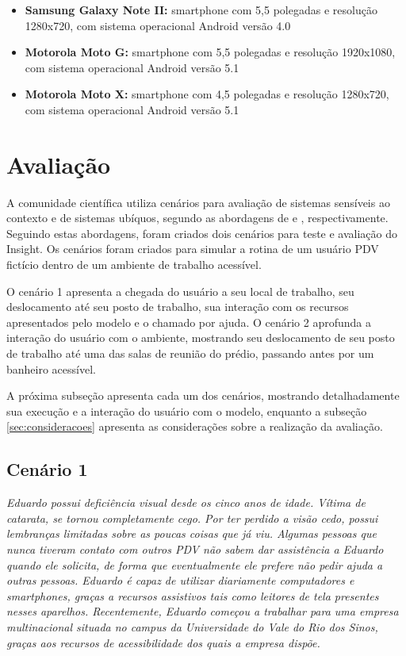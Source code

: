 \documentclass[twoside,english,brazilian]{UNISINOSartigo}
\begin{document}
\begin{itemize}
\item \textbf{Samsung Galaxy Note II:} smartphone com 5,5 polegadas e resolução 1280x720, com sistema operacional Android versão 4.0
\item \textbf{Motorola Moto G:} smartphone com 5,5 polegadas e resolução 1920x1080, com sistema operacional Android versão 5.1
\item \textbf{Motorola Moto X:} smartphone com 4,5 polegadas e resolução 1280x720, com sistema operacional Android versão 5.1
\end{itemize}

\section{Avaliação}
A comunidade científica utiliza cenários para avaliação de sistemas sensíveis ao contexto e de sistemas ubíquos, segundo as abordagens de  e , respectivamente. Seguindo estas abordagens, foram criados dois cenários para teste e avaliação do Insight. Os cenários foram criados para simular a rotina de um usuário PDV fictício dentro de um ambiente de trabalho acessível. 

O cenário 1 apresenta a chegada do usuário a seu local de trabalho, seu deslocamento até seu posto de trabalho, sua interação com os recursos apresentados pelo modelo e o chamado por ajuda. O cenário 2 aprofunda a interação do usuário com o ambiente, mostrando seu deslocamento de seu posto de trabalho até uma das salas de reunião do prédio, passando antes por um banheiro acessível. 

A próxima subseção apresenta cada um dos cenários, mostrando detalhadamente sua execução e a interação do usuário com o modelo, enquanto a subseção \ref{sec:consideracoes} apresenta as considerações sobre a realização da avaliação.

\subsection{Cenário 1}
\textit{Eduardo possui deficiência visual desde os cinco anos de idade. Vítima de catarata, se tornou completamente cego. Por ter perdido a visão cedo, possui lembranças limitadas sobre as poucas coisas que já viu. Algumas pessoas que nunca tiveram contato com outros PDV não sabem dar assistência a Eduardo quando ele solicita, de forma que eventualmente ele prefere não pedir ajuda a outras pessoas. Eduardo é capaz de utilizar diariamente computadores e smartphones, graças a recursos assistivos tais como leitores de tela presentes nesses aparelhos. Recentemente, Eduardo começou a trabalhar para uma empresa multinacional situada no campus da Universidade do Vale do Rio dos Sinos, graças aos recursos de acessibilidade dos quais a empresa dispõe.}
\end{document}

